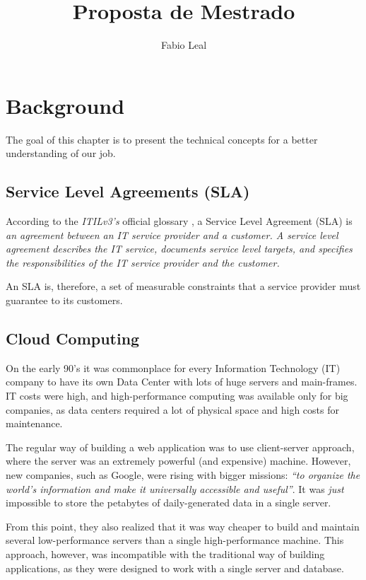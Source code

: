 \documentclass{article}
\begin{document}
\title{Proposta de Mestrado}
\author{Fabio Leal}
\maketitle  





\section{Background}
The goal of this chapter is to present the technical concepts for a better understanding of our job. 


\subsection{Service Level Agreements (SLA)}
According to the \textit{ITILv3's} official glossary \cite{itilv3glossary}, a Service Level Agreement (SLA) is \textit{an agreement between an IT service provider and a customer.  A service level agreement describes the IT service, documents service level targets, and specifies the responsibilities of the IT service provider and the customer.} 

An SLA is, therefore, a set of measurable constraints that a service provider must guarantee to its customers. 


\subsection{Cloud Computing}
On the early 90's it was commonplace for every Information Technology (IT) company to have its own Data Center with lots of huge servers and main-frames. IT costs were high, and high-performance computing was available only for big companies, as data centers required a lot of physical space and high costs for maintenance. 

The regular way of building a web application was to use client-server approach, where the server was an extremely powerful (and expensive) machine. However, new companies, such as Google, were rising with bigger missions: \textit{``to organize the world's information and make it universally accessible and useful''}. It was \textit{just} impossible to store the petabytes of daily-generated data in a single server. 

From this point, they also realized that it was way cheaper to build and maintain several low-performance servers than a single high-performance machine. This approach, however, was incompatible with the traditional way of building applications, as they were designed to work with a single server and database. 
\end{document}
